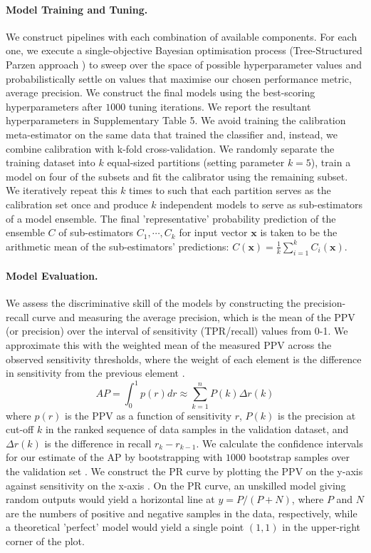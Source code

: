 \documentclass[fleqn,10pt]{wlscirep}
\begin{document}
\paragraph{Model Training and Tuning.} We construct pipelines with each combination of available components. For each one, we execute a single-objective Bayesian optimisation process (Tree-Structured Parzen approach \cite{Bergstra11}) to sweep over the space of possible hyperparameter values and probabilistically settle on values that maximise our chosen performance metric, average precision. We construct the final models using the best-scoring hyperparameters after $1000$ tuning iterations. We report the resultant hyperparameters in Supplementary Table 5. We avoid training the calibration meta-estimator on the same data that trained the classifier and, instead, we combine calibration with k-fold cross-validation. We randomly separate the training dataset into $k$ equal-sized partitions (setting parameter $k=5$), train a model on four of the subsets and fit the calibrator using the remaining subset. We iteratively repeat this $k$ times to such that each partition serves as the calibration set once and produce $k$ independent models to serve as sub-estimators of a model ensemble. The final 'representative' probability prediction of the ensemble $C$ of sub-estimators $C_1, \cdots, C_k$ for input vector $\bm{x}$ is taken to be the arithmetic mean of the sub-estimators' predictions: $C(\bm{x}) = \frac{1}{k} \sum^k_{i=1} C_{i}(\bm{x})$.

\paragraph{Model Evaluation.} We assess the discriminative skill of the models by constructing the precision-recall curve and measuring the average precision, which is the mean of the PPV (or precision) over the interval of sensitivity (TPR/recall) values from 0-1. We approximate this with the weighted mean of the measured PPV across the observed sensitivity thresholds, where the weight of each element is the difference in sensitivity from the previous element \cite{Boyd13}.
\begin{equation*}
    AP = \int_0^1 p(r)dr \approx \sum^n_{k=1} P(k)\Delta r(k)
\end{equation*}
where $p(r)$ is the PPV as a function of sensitivity $r$, $P(k)$ is the precision at cut-off $k$ in the ranked sequence of data samples in the validation dataset, and $\Delta r(k)$ is the difference in recall $r_k - r_{k-1}$. We calculate the confidence intervals for our estimate of the AP by bootstrapping with $1000$ bootstrap samples over the validation set \cite{Kohavi95}. We construct the PR curve by plotting the PPV on the y-axis against sensitivity on the x-axis \cite{Davis06}. On the PR curve, an unskilled model giving random outputs would yield a horizontal line at $y=P/(P+N)$, where $P$ and $N$ are the numbers of positive and negative samples in the data, respectively, while a theoretical 'perfect' model would yield a single point $(1,1)$ in the upper-right corner of the plot.
\end{document}
